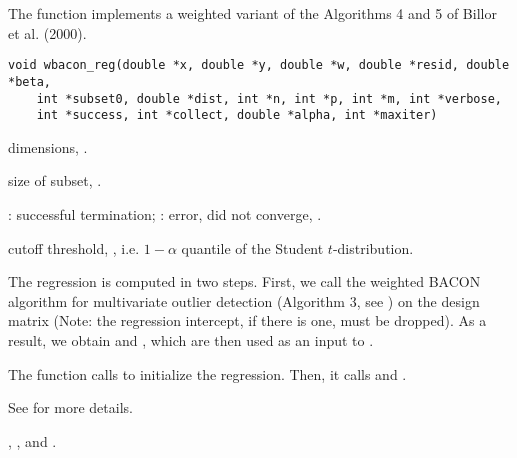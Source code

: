 \documentclass[a4paper,oneside,10pt,DIV=12]{scrreprt}
\begin{document}
\begin{Description}
The function implements a weighted variant of the Algorithms 4 and 5 of 
Billor et al.  (2000).  
\end{Description}
\begin{Usage}
\begin{verbatim}
void wbacon_reg(double *x, double *y, double *w, double *resid, double *beta,
    int *subset0, double *dist, int *n, int *p, int *m, int *verbose,
    int *success, int *collect, double *alpha, int *maxiter)
\end{verbatim}
\end{Usage}
\begin{Arguments}
	\begin{ldescription}
		\item[\code{n, p}] dimensions, \code{[int]}.
		\item[\code{m}] size of subset, \code{[int]}.
		\VERBOSE
		\item[\code{success}] : successful termination; : error,
			did not converge, \code{[int]}.
		\COLLECT
		\item[\code{alpha}] cutoff threshold, \code{[double]}, i.e.
			$1- \alpha$ quantile of the Student $t$-distribution.
	\end{ldescription}
\end{Arguments}
\begin{Details}
The regression is computed in two steps. First, we call the weighted BACON
algorithm for multivariate outlier detection (Algorithm 3, see
) on the design matrix  (Note: the
regression intercept, if there is one, must be dropped). As a result, we obtain
 and , which are then used as an input to 
. 

The function  calls 
to initialize the regression. Then, it calls 
 and 
.

See  for more details.
\end{Details}
\begin{Dependencies}
	,
	, and 
	.
\end{Dependencies}
\end{document}
